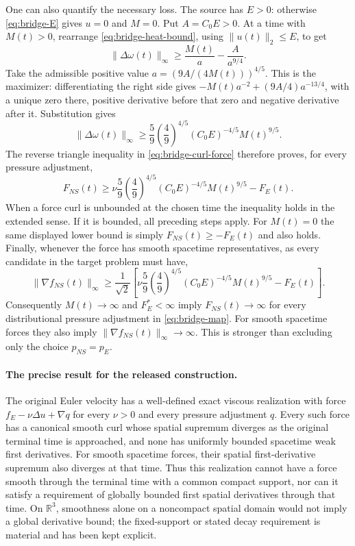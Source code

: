 One can also quantify the necessary loss.  The source has $E>0$:
otherwise \eqref{eq:bridge-E} gives $u=0$ and $M=0$.
Put $A=C_0E>0$.  At a time with $M(t)>0$, rearrange
\eqref{eq:bridge-heat-bound}, using $\|u(t)\|_2\le E$, to get
\[
 \|\Delta\omega(t)\|_\infty
       \ge \frac{M(t)}{a}-\frac{A}{a^{9/4}}.
\]
Take the admissible positive value
$a=(9A/(4M(t)))^{4/5}$.  This is the maximizer: differentiating the
right side gives $-M(t)a^{-2}+(9A/4)a^{-13/4}$, with a unique zero
there, positive derivative before that zero and negative derivative
after it.  Substitution gives
\begin{equation}\label{eq:bridge-laplacian-lower}
 \|\Delta\omega(t)\|_\infty
 \ge \frac{5}{9}\left(\frac{4}{9}\right)^{4/5}
               (C_0E)^{-4/5}M(t)^{9/5}.
\end{equation}
The reverse triangle inequality in \eqref{eq:bridge-curl-force}
therefore proves, for every pressure adjustment,
\begin{equation}\label{eq:bridge-force-lower}
 F_{NS}(t)\ge
 \nu\frac{5}{9}\left(\frac{4}{9}\right)^{4/5}
                (C_0E)^{-4/5}M(t)^{9/5}-F_E(t).
\end{equation}
When a force curl is unbounded at the chosen time the inequality holds
in the extended sense.  If it is bounded, all preceding steps apply.
For $M(t)=0$ the same displayed lower bound is simply
$F_{NS}(t)\ge-F_E(t)$ and also holds.  Finally, whenever the force has
smooth spacetime representatives, as every candidate in the target problem
must have,
\begin{equation}\label{eq:bridge-gradient-lower}
 \|\nabla f_{NS}(t)\|_\infty\ge\frac1{\sqrt2}
 \left[\nu\frac{5}{9}\left(\frac{4}{9}\right)^{4/5}
              (C_0E)^{-4/5}M(t)^{9/5}-F_E(t)\right].
\end{equation}
Consequently $M(t)\to\infty$ and $F_E^*<\infty$ imply
$F_{NS}(t)\to\infty$ for every distributional pressure adjustment in
\eqref{eq:bridge-map}.  For smooth spacetime forces they also imply
$\|\nabla f_{NS}(t)\|_\infty\to\infty$.  This is stronger than
excluding only the choice
$p_{NS}=p_E$.

\paragraph{The precise result for the released construction.}
The original Euler velocity has a well-defined exact viscous realization
with force $f_E-\nu\Delta u+\nabla q$ for every $\nu>0$ and every
pressure adjustment $q$.  Every such force has a canonical smooth curl
whose spatial supremum diverges as the original terminal time is
approached, and none has uniformly bounded spacetime weak first
derivatives.  For smooth spacetime forces,
their spatial first-derivative supremum also diverges at that time.
Thus this realization cannot have a force smooth through the terminal
time with a common compact support, nor can it satisfy a requirement
of globally bounded first spatial derivatives through that time.
On $\mathbb R^3$, smoothness alone on a noncompact spatial domain would
not imply a global derivative bound; the fixed-support or stated decay
requirement is material and has been kept explicit.

